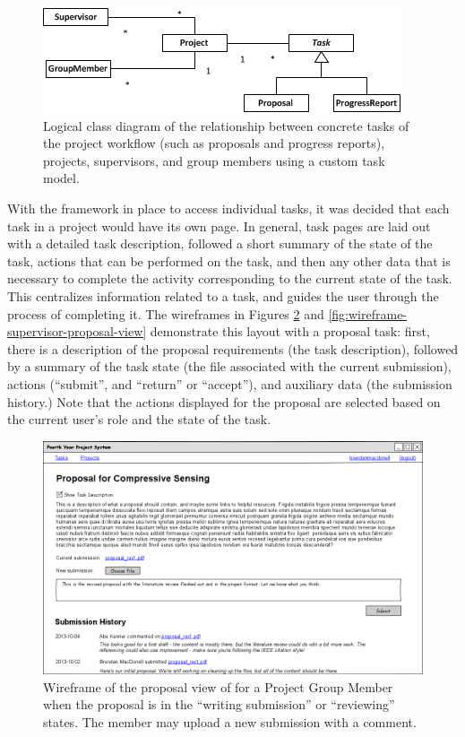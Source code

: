 \documentclass[document.tex]{subfiles}
\begin{document}
\begin{figure}[!htbp]
\centering \includegraphics{./img/case-study-fourth-year-system/task-through-project-static-structure}
\caption{Logical class diagram of the relationship between concrete tasks of the project workflow (such as proposals and progress reports), projects, supervisors, and group members using a custom task model.}
\label{fig:custom-task-simplicity}
\end{figure}

With the framework in place to access individual tasks, it was decided that each task in a project would have its own page. In general, task pages are laid out with a detailed task description, followed a short summary of the state of the task, actions that can be performed on the task, and then any other data that is necessary to complete the activity corresponding to the current state of the task. This centralizes information related to a task, and guides the user through the process of completing it. The wireframes in Figures \ref{fig:wireframe-group-member-proposal-view} and \ref{fig:wireframe-supervisor-proposal-view} demonstrate this layout with a proposal task: first, there is a description of the proposal requirements (the task description), followed by a summary of the task state (the file associated with the current submission), actions (``submit'', and ``return'' or ``accept''), and auxiliary data (the submission history.) Note that the actions displayed for the proposal are selected based on the current user's role and the state of the task.

\begin{figure}[!htbp]
\centering \includegraphics[width=6in]{./img/case-study-fourth-year-system/group-member-proposal-view_wireframe}
\caption{Wireframe of the proposal view of for a Project Group Member when the proposal is in the ``writing submission'' or ``reviewing'' states. The member may upload a new submission with a comment.}
\label{fig:wireframe-group-member-proposal-view}
\end{figure}
\end{document}
